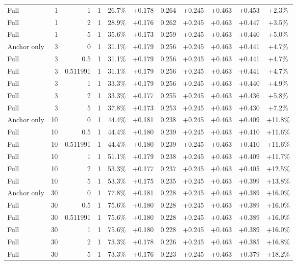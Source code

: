 \begin{table}[htbp]
\begin{tabular}{lrrrccccccc}
Full & 1 & 1 & 1 & 26.7\% & +0.178 & 0.264 & +0.245 & +0.463 & +0.453 & +2.3\% \\
Full & 1 & 2 & 1 & 28.9\% & +0.176 & 0.262 & +0.245 & +0.463 & +0.447 & +3.5\% \\
Full & 1 & 5 & 1 & 35.6\% & +0.173 & 0.259 & +0.245 & +0.463 & +0.440 & +5.0\% \\
Anchor only & 3 & 0 & 1 & 31.1\% & +0.179 & 0.256 & +0.245 & +0.463 & +0.441 & +4.7\% \\
Full & 3 & 0.5 & 1 & 31.1\% & +0.179 & 0.256 & +0.245 & +0.463 & +0.441 & +4.7\% \\
Full & 3 & 0.511991 & 1 & 31.1\% & +0.179 & 0.256 & +0.245 & +0.463 & +0.441 & +4.7\% \\
Full & 3 & 1 & 1 & 33.3\% & +0.179 & 0.256 & +0.245 & +0.463 & +0.440 & +4.9\% \\
Full & 3 & 2 & 1 & 33.3\% & +0.177 & 0.255 & +0.245 & +0.463 & +0.436 & +5.8\% \\
Full & 3 & 5 & 1 & 37.8\% & +0.173 & 0.253 & +0.245 & +0.463 & +0.430 & +7.2\% \\
Anchor only & 10 & 0 & 1 & 44.4\% & +0.181 & 0.238 & +0.245 & +0.463 & +0.409 & +11.8\% \\
Full & 10 & 0.5 & 1 & 44.4\% & +0.180 & 0.239 & +0.245 & +0.463 & +0.410 & +11.6\% \\
Full & 10 & 0.511991 & 1 & 44.4\% & +0.180 & 0.239 & +0.245 & +0.463 & +0.410 & +11.6\% \\
Full & 10 & 1 & 1 & 51.1\% & +0.179 & 0.238 & +0.245 & +0.463 & +0.409 & +11.7\% \\
Full & 10 & 2 & 1 & 53.3\% & +0.177 & 0.237 & +0.245 & +0.463 & +0.405 & +12.5\% \\
Full & 10 & 5 & 1 & 53.3\% & +0.175 & 0.235 & +0.245 & +0.463 & +0.399 & +13.8\% \\
Anchor only & 30 & 0 & 1 & 77.8\% & +0.181 & 0.228 & +0.245 & +0.463 & +0.389 & +16.0\% \\
Full & 30 & 0.5 & 1 & 75.6\% & +0.180 & 0.228 & +0.245 & +0.463 & +0.389 & +16.0\% \\
Full & 30 & 0.511991 & 1 & 75.6\% & +0.180 & 0.228 & +0.245 & +0.463 & +0.389 & +16.0\% \\
Full & 30 & 1 & 1 & 75.6\% & +0.180 & 0.228 & +0.245 & +0.463 & +0.389 & +16.0\% \\
Full & 30 & 2 & 1 & 73.3\% & +0.178 & 0.226 & +0.245 & +0.463 & +0.385 & +16.8\% \\
Full & 30 & 5 & 1 & 73.3\% & +0.176 & 0.223 & +0.245 & +0.463 & +0.379 & +18.2\% \\

\end{tabular}
\end{table}
